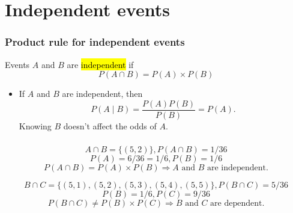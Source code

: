 \documentclass[slidestop,compress,mathserif]{beamer}
\begin{document}
\section{Independent events}
\begin{frame}
\frametitle{Product rule for independent events}

\begin{defn}
Events $A$ and $B$ are \hl{independent} if
\[P(A \cap B) = P(A) \times P(B) \]
\end{defn}

\pause
\begin{itemize}
\item If $A$ and $B$ are independent, then
\[P(A \mid B) = \frac{P(A)P(B)}{P(B)} = P(A).\]
Knowing $B$ doesn't affect the odds of $A$.
\end{itemize}

\end{frame}
\begin{frame}\frametitle{}

\pause
\[A \cap B = \{ (5,2) \}, P(A \cap B) = 1/36\]
\[P(A) = 6/36=1/6, P(B) = 1/6\]
\pause \vspace{-0.4cm}
\[P(A \cap B) = P(A) \times P(B) \Longrightarrow A \text{ and } B \text{ are independent.}\]

\pause
\[B \cap C = \{ (5,1), (5,2), (5,3), (5,4), (5,5) \}, P(B \cap C) = 5/36\]
\[P(B) = 1/6, P(C) = 9 / 36\]
\pause \vspace{-0.4cm}
\[P(B \cap C) \neq P(B) \times P(C) \Longrightarrow B \text{ and } C \text{ are dependent.}\]

\end{frame}
\end{document}

